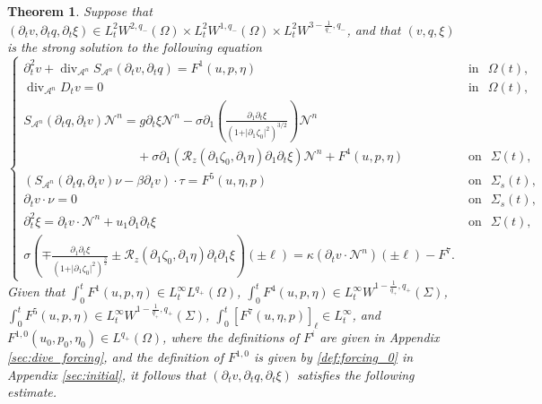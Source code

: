 \documentclass[letterpaper,reqno,10pt,twoside]{amsart}
\newtheorem{theorem}{Theorem}[section]
\theoremstyle{definition}
\theoremstyle{remark}
\def\p{\partial}
\begin{document}
	\begin{theorem}{\label{thm:pressure_+}}
		Suppose that $(\p_{t}v,\p_{t}q,\p_{t}\xi)\in L_{t}^{2}W^{2,q_{-}}(\Omega)\times L_{t}^{2}W^{1,q_{-}}(\Omega)\times L_{t}^{2}W^{3-\frac{1}{q_{-}},q_{-}}$, and that $(v,q,\xi)$ is the strong solution to the following equation
		\begin{equation}\label{eq:quasi_linear_2}
			\begin{cases}
				\partial_{t}^{2}v+\operatorname{div}_{\mathcal{A}^{n}}S_{\mathcal{A}^{n}}(\p_{t}v,\p_{t}q)=F^{1}(u,p,\eta)~~~&\operatorname{in}~~\Omega(t),\\
				\operatorname{div}_{\mathcal{A}^{n}}D_{t}v=0~~~&\operatorname{in}~~\Omega(t),\\
				S_{\mathcal{A}^{n}}(\p_{t}q,\p_{t}v)\mathcal{N}^{n}=g\p_{t}\xi\mathcal{N}^{n}-\sigma\partial_{1}\left(\frac{\p_1\p_t\xi}{(1+\vert \partial_{1}\zeta_{0}\vert^{2})^{3/2}}\right)\mathcal{N}^{n}\\
				\quad\quad\quad\quad\quad\quad\quad\quad\quad+\sigma\partial_{1}(\mathcal{R}_{z}(\partial_{1}\zeta_{0},\partial_{1}\eta)\partial_{1}\partial_{t}\xi)\mathcal{N}^{n}+F^{4}(u,p,\eta)~~~&\operatorname{on}~~\Sigma(t),\\
				(S_{\mathcal{A}^{n}}(\p_{t}q,\p_{t}v)\nu-\beta \p_{t}v)\cdot \tau=F^{5}(u,\eta,p)~~~&\operatorname{on}~~\Sigma_{s}(t),\\
				\p_{t}v\cdot \nu=0~~~&\operatorname{on}~~\Sigma_{s}(t),\\
				\partial_{t}^{2}\xi=\p_{t}v\cdot \mathcal{N}^{n}+u_{1}\partial_{1}\partial_{t}\xi~~~&\operatorname{on}~~\Sigma(t),\\
				\sigma(\mp \frac{\partial_{1}\p_{t}\xi}{(1+\vert \partial_{1}\zeta_{0}\vert^{2})^{\frac{3}{2}}}\pm \mathcal{R}_{z}(\partial_{1}\zeta_{0},\partial_{1}\eta)\partial_{t}\partial_{1}\xi)(\pm \ell)=\kappa (\p_{t}v\cdot \mathcal{N}^{n})(\pm \ell)-{F}^{7}.
			\end{cases}
		\end{equation}
		Given that $\int_{0}^{t}F^{1}(u,p,\eta)\in L_{t}^{\infty}L^{q_{+}}(\Omega)$, $\int_{0}^{t}F^{4}(u,p,\eta)\in L_{t}^{\infty}W^{1-\frac{1}{q_{+}},q_{+}}(\Sigma)$, $\int_{0}^{t}F^{5}(u,p,\eta)\in L_{t}^{\infty}W^{1-\frac{1}{q_{+}},q_{+}}(\Sigma)$, $\int_{0}^{t}[F^{7}(u,\eta,p)]_{\ell}\in L_{t}^{\infty}$, 
		and $F^{1,0}(u_{0},p_{0},\eta_{0})\in L^{q_{+}}(\Omega)$,
		where the definitions of \(F^{i}\) are given in Appendix \ref{sec:dive_forcing}, and the definition of \(F^{1,0}\) is given by \eqref{def:forcing_0} in Appendix \ref{sec:initial}, it follows that \((\partial_t v,\partial_t q,\partial_t \xi)\) satisfies the following estimate.

\end{theorem}
\end{document}
